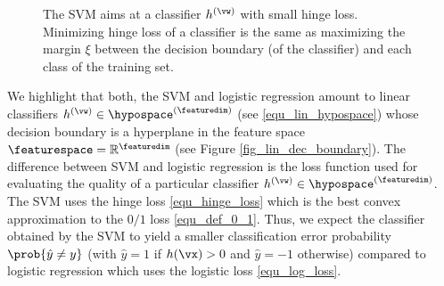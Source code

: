 \documentclass[12pt]{report}
\begin{document}
\begin{figure}[htbp]
\begin{center}
\caption{The SVM aims at a classifier $h^{(\vw)}$ with small hinge loss. Minimizing hinge loss of a 
 classifier is the same as maximizing the margin $\xi$ between the decision boundary (of the classifier) 
 and each class of the training set.}
\label{fig_svm}
\end{center}
\end{figure}

We highlight that both, the SVM and logistic regression amount to linear 
classifiers $h^{(\vw)} \in \hypospace^{(\featuredim)}$ (see \eqref{equ_lin_hypospace}) 
whose decision boundary is a hyperplane in the feature space $\featurespace = \mathbb{R}^{\featuredim}$ (see Figure \ref{fig_lin_dec_boundary}). The difference between SVM and logistic regression is the loss function used for 
evaluating the quality of a particular classifier $h^{(\vw)} \in \hypospace^{(\featuredim)}$. 
The SVM uses the hinge loss \eqref{equ_hinge_loss} which is the best convex approximation 
to the $0/1$ loss \eqref{equ_def_0_1}. Thus, we expect the classifier obtained by the SVM to 
yield a smaller classification error probability $\prob{ \hat{y} \neq y }$ (with $\hat{y} =1$ 
if $h(\vx) >0$ and $\hat{y}=-1$ otherwise) compared to logistic regression which uses 
the logistic loss \eqref{equ_log_loss}. 
\end{document}
